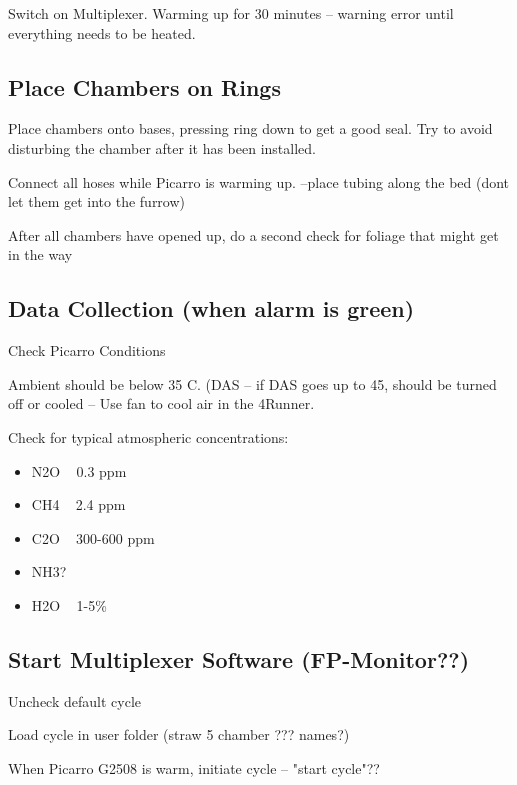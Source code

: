 \documentclass[12pt]{../SOP3_alpha}
\begin{document}
\NP Switch on Multiplexer. Warming up for 30 minutes -- warning error until everything needs to be heated.

\subsection{Place Chambers on Rings}

\NP Place chambers onto bases, pressing ring down to get a good seal. Try to avoid disturbing the chamber after it has been installed. 

\NP Connect all hoses while Picarro is warming up. --place tubing along the bed (dont let them get into the furrow)

\NP After all chambers have opened up, do a second check for foliage that might get in the way

\subsection{Data Collection (when alarm is green)}

\NP Check Picarro Conditions

\NP Ambient should be below 35 C. (DAS -- if DAS goes up to 45, should be turned off or cooled -- Use fan to cool air in the 4Runner.
                               
\NP Check for typical atmospheric concentrations:
                                 
\begin{itemize}
\item N2O ~ 0.3 ppm
\item CH4 ~ 2.4 ppm
\item C2O ~ 300-600 ppm
\item NH3?
\item H2O ~ 1-5\%
\end{itemize}
                               
 \subsection{Start Multiplexer Software (FP-Monitor??)}
                               
\NP Uncheck default cycle
                               
\NP Load cycle in user folder (straw 5 chamber ??? names?)
                               
\NP When Picarro G2508 is warm, initiate cycle -- "start cycle"??
                               
\end{document}
